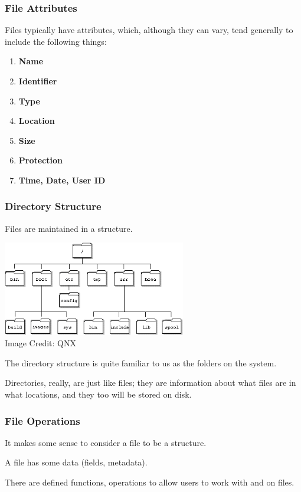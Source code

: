 \begin{frame}
\frametitle{File Attributes}

Files typically have attributes, which, although they can vary, tend generally to include the following things:

\begin{enumerate}
	\item \textbf{Name}
	\item \textbf{Identifier}
	\item \textbf{Type}
	\item \textbf{Location}
	\item \textbf{Size}
	\item \textbf{Protection}
	\item \textbf{Time, Date, User ID}
\end{enumerate}


\end{frame}

\begin{frame}
\frametitle{Directory Structure}

Files are maintained in a structure. 

\begin{center}
	\includegraphics[width=0.6\textwidth]{images/qnx-directory.png}\\
		Image Credit: QNX
\end{center} 



The directory structure is quite familiar to us as the folders on the system. 

Directories, really, are just like files; they are information about what files are in what locations, and they too will be stored on disk.


\end{frame}

\begin{frame}
\frametitle{File Operations}

It makes some sense to consider a file to be a structure. 

A file has some data (fields, metadata).

There are defined functions, operations to allow users to work with and on files. 

\end{frame}

